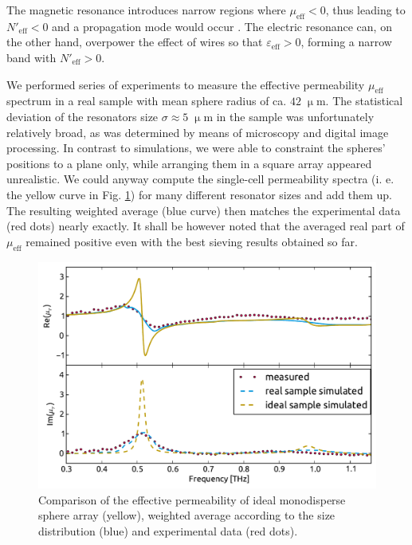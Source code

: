 {The magnetic resonance introduces narrow regions where $\mu_{\text{eff}} < 0$, thus leading to $N'_{\text{eff}} < 0$ and a propagation mode would occur \cite{dominec2013resonant}. The electric resonance can, on the other hand, overpower the effect of wires so that $\varepsilon_{\text{eff}} > 0$, forming a narrow band with $N'_{\text{eff}} > 0$.

We performed series of experiments to measure the effective permeability  $\mu_{\text{eff}}$ spectrum in a real sample with mean sphere radius of ca. $42\;\upmu$m. The statistical deviation of the resonators size $\sigma \approx 5\;\upmu$m in the sample was unfortunately relatively broad, as was determined by means of microscopy and digital image processing. In contrast to simulations, we were able to constraint the spheres' positions to a plane only, while arranging them in a square array appeared unrealistic. We could anyway compute the single-cell permeability spectra (i. e. the yellow curve in Fig. \ref{fg_experimentalConv}) for many different resonator sizes and add them up. The resulting weighted average (blue curve) then matches the experimental data (red dots) nearly exactly. It shall be however noted that the averaged real part of $\mu_{\text{eff}}$ remained positive even with the best sieving results obtained so far.
\begin{figure}[ht]  \caption{Comparison of the effective permeability of ideal monodisperse sphere array (yellow), weighted average according to the size distribution (blue) and experimental data (red dots).}
\label{fg_experimentalConv} \centering 
\includegraphics[width=12cm]{img/Spheres_FDTD_experimentalConv.pdf}
\end{figure}
}
